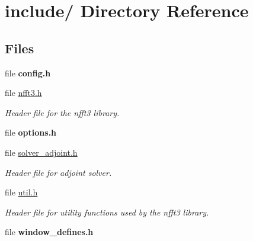 \hypertarget{dir_000005}{
\section{include/ Directory Reference}
\label{dir_000005}
}
\subsection*{Files}
\begin{CompactItemize}
\item 
file {\bf config.h}
\item 
file \hyperlink{nfft3_8h}{nfft3.h}
\begin{CompactList}\small\item\em Header file for the nfft3 library. \item\end{CompactList}

\item 
file {\bf options.h}
\item 
file \hyperlink{solver__adjoint_8h}{solver\_\-adjoint.h}
\begin{CompactList}\small\item\em Header file for adjoint solver. \item\end{CompactList}

\item 
file \hyperlink{util_8h}{util.h}
\begin{CompactList}\small\item\em Header file for utility functions used by the nfft3 library. \item\end{CompactList}

\item 
file {\bf window\_\-defines.h}
\end{CompactItemize}
